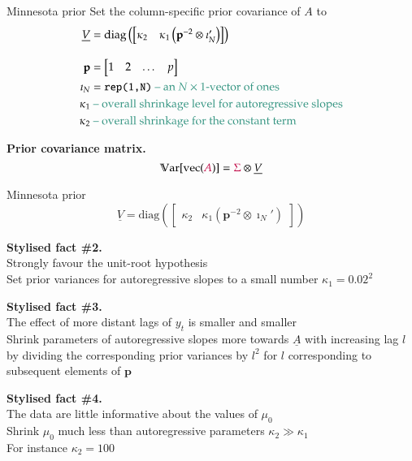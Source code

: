 \documentclass[notes,blackandwhite,mathsans,usenames,dvipsnames]{beamer}
\begin{document}
\begin{frame}{Minnesota prior}
\small
{\color{mcxs2}Set the column-specific prior covariance of} $A$ {\color{mcxs2}to}
\begin{align*}
\underline{V}&=\text{diag}\left(\begin{bmatrix}\kappa_2& \kappa_1\left(\mathbf{p}^{-2}\otimes\imath_N'\right)\end{bmatrix}\right)\\[2ex]
\mathbf{p} &= \begin{bmatrix} 1&2&\dots&p \end{bmatrix}\\
\imath_N &=\texttt{rep(1,N)}{\color{mcxs2}\text{ -- an $N\times1$-vector of ones}}\\
\kappa_1 &{\color{mcxs2}\text{ -- overall shrinkage level for autoregressive slopes}}\\
\kappa_2 &{\color{mcxs2}\text{ -- overall shrinkage for the constant term}}
\end{align*}

\bigskip\textbf{Prior covariance matrix.}
$$ \mathbb{V}\text{ar}[\text{vec}({\color{purple}A})] = {\color{purple}\Sigma}\otimes\underline{V} $$
\end{frame}






\begin{frame}{Minnesota prior}
\small
$$
\underline{V}=\text{diag}\left(\begin{bmatrix}\kappa_2& \kappa_1\left(\mathbf{p}^{-2}\otimes\imath_N'\right)\end{bmatrix}\right) $$

\bigskip\textbf{Stylised fact \#2.}\\
Strongly favour the unit-root hypothesis \\
{\color{mcxs2}Set prior variances for autoregressive slopes to a small number} $\kappa_1=0.02^2$

\bigskip\textbf{Stylised fact \#3.}\\
The effect of more distant lags of $y_t$ is smaller and smaller\\
{\color{mcxs2}Shrink parameters of autoregressive slopes more towards} $\underline{A}$ {\color{mcxs2}with increasing lag} $l$ {\color{mcxs2}by dividing the corresponding prior variances by} $l^2$ {\color{mcxs2}for} $l$ {\color{mcxs2}corresponding to subsequent elements of} $\mathbf{p}$

\bigskip\textbf{Stylised fact \#4.}\\
The data are little informative about the values of $\mu_0$ \\
{\color{mcxs2}Shrink $\mu_0$ much less than autoregressive parameters} $\kappa_2\gg\kappa_1$\\ {\color{mcxs2}For instance }$\kappa_2=100$

\end{frame}
\end{document}
